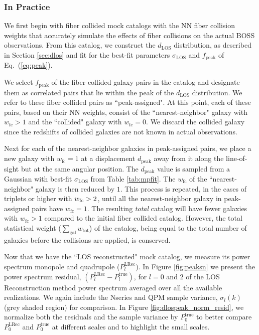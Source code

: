 \subsubsection{In Practice}
We first begin with fiber collided mock catalogs with the NN 
fiber collision weights that accurately simulate the effects of 
fiber collisions on the actual BOSS observations. From this catalog, we
construct the $d_\mathrm{LOS}$ distribution, as described in Section 
\ref{sec:dlos} and fit for the best-fit parameters $\sigma_\mathrm{LOS}$ 
and $f_\mathrm{peak}$ of Eq.~(\ref{eq:peak}).

We select $f_\mathrm{peak}$ of the fiber collided galaxy pairs in the catalog 
and designate them as correlated pairs that lie within the peak of the 
$d_\mathrm{LOS}$ distribution. We refer to these fiber collided pairs as 
``peak-assigned". At this point, each of these pairs, based on their NN 
weights, consist of the ``nearest-neighbor" galaxy with $w_\mathrm{fc} > 1$ 
and the ``collided" galaxy with $w_\mathrm{fc} = 0$. We discard the collided galaxy
since the redshifts of collided galaxies are not known in actual observations. 

Next for each of the nearest-neighbor galaxies in peak-assigned pairs, we 
place a new galaxy with $w_\mathrm{fc} = 1$ at a displacement $d_\mathrm{peak}$ 
away from it along the line-of-sight but at the same angular position. The $d_\mathrm{peak}$ 
value is sampled from a Gaussian with best-fit $\sigma_\mathrm{LOS}$ from 
Table \ref{tab:mpfit}. The $w_\mathrm{fc}$ of the ``nearest-neighbor" galaxy 
is then reduced by $1$. This process is repeated, in the cases of triplets 
or higher with $w_{\rm fc} > 2$, until all the nearest-neighbor galaxy in 
peak-assigned pairs have $w_\mathrm{fc}=1$. The resulting {\em total} catalog will have fewer 
galaxies with $w_\mathrm{fc} > 1$ compared to the initial fiber collided catalog.
However, the total statistical weight ($\sum_\mathrm{gal} w_\mathrm{tot}$) of 
the catalog, being equal to the total number of galaxies before the collisions
are applied, is conserved. 

Now that we have the ``LOS reconstructed" mock catalog, we measure its power 
spectrum monopole and quadrupole ($P^\mathrm{LRec}_l$). In Figure 
\ref{fig:peaksn} we present the power spectrum residual, 
$(P^\mathrm{LRec}_l-P^\mathrm{true}_l)$,  
for $l = 0$ and $2$ of the LOS Reconstruction method power spectrum averaged over all the available realizations. 
We again include the Nseries and QPM sample variance, $\sigma_l(k)$ 
(grey shaded region) for comparison.  In Figure \ref{fig:dlospeak_norm_resid}, 
we normalize both the residuals and the sample variance by $P_0^\mathrm{true}$ 
to better compare $P_0^\mathrm{LRec}$ and $P_0^\mathrm{true}$ at different scales 
and to highlight the small scales. 

